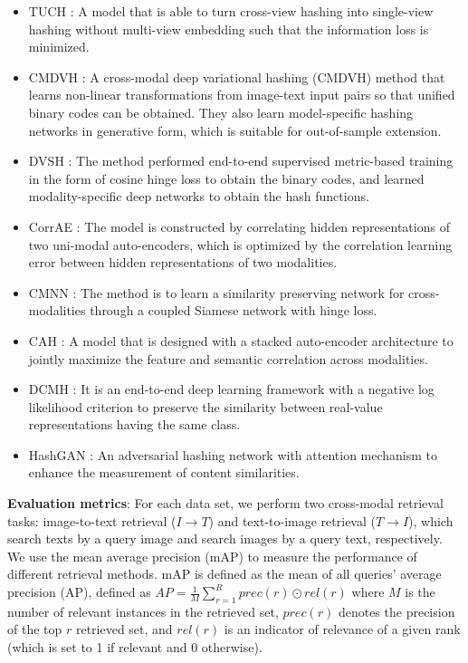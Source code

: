 \documentclass[10pt,journal,twocolumn]{IEEEtran}
\begin{document}
\begin{itemize}
  \item TUCH \cite{TUCH}: A model that is able to turn cross-view hashing into single-view hashing without multi-view embedding such that the information loss is minimized.
  \item CMDVH \cite{CMDVH}: A cross-modal deep variational hashing (CMDVH) method that learns non-linear transformations from image-text input pairs so that unified binary codes can be obtained. They also learn model-specific hashing networks in generative form, which is suitable for out-of-sample extension.
  \item DVSH \cite{DVSH}: The method performed end-to-end supervised metric-based training in the form of cosine hinge loss to obtain the binary codes, and learned modality-specific deep networks to obtain the hash functions.
  \item CorrAE \cite{Corr-AE}: The model is constructed by correlating hidden representations of two uni-modal auto-encoders, which is optimized by the correlation learning error between hidden representations of two modalities.
  \item CMNN \cite{Multimodal-hashing}: The method is to learn a similarity preserving network for cross-modalities through a coupled Siamese network with hinge loss.
  \item CAH \cite{CAH}: A model that is designed with a stacked auto-encoder architecture to jointly maximize the feature and semantic correlation across modalities.
  \item DCMH \cite{DCMH}: It is an end-to-end deep learning framework with a negative log likelihood criterion to preserve the similarity between real-value representations having the same class.
  \item HashGAN \cite{HashGAN}: An adversarial hashing network with attention mechanism to enhance the measurement of content similarities.
\end{itemize}


\textbf{Evaluation metrics}: For each data set, we perform two cross-modal retrieval tasks: image-to-text retrieval ($I \rightarrow T$) and text-to-image retrieval ($T \rightarrow I$), which search texts by a query image and search images by a query text, respectively. We use the mean average precision (mAP) to measure the performance of different retrieval methods. mAP is defined as the mean of all queries' average precision (AP), defined as $AP=\frac{1}{M} \sum_{r=1}^R prec(r) \odot rel(r)$ where $M$ is the number of relevant instances in the retrieved set, $prec(r)$ denotes the precision of the top $r$ retrieved set, and $rel(r)$ is an indicator of relevance of a given rank (which is set to 1 if relevant and 0 otherwise).
\end{document}
